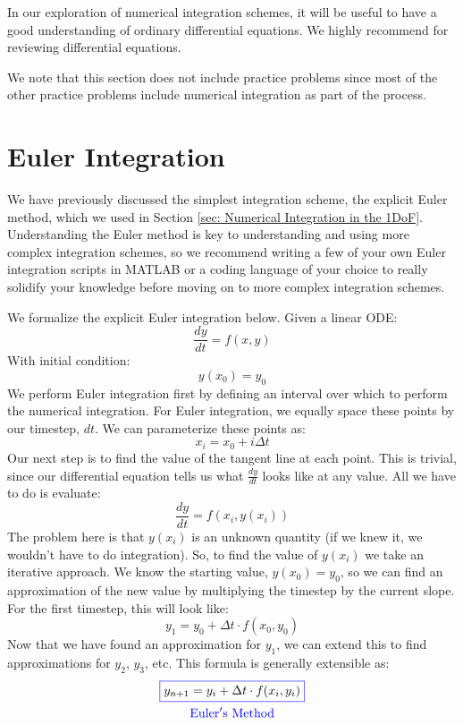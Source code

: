 \documentclass[12pt]{report}
\begin{document}
In our exploration of numerical integration schemes, it will be useful to have a good understanding of ordinary differential equations. We highly recommend \cite{dawkins_differential_2023} for reviewing differential equations.

We note that this section does not include practice problems since most of the other practice problems include numerical integration as part of the process.

\section{Euler Integration}\label{sec:euler integration}
We have previously discussed the simplest integration scheme, the explicit Euler method, which we used in Section \ref{sec: Numerical Integration in the 1DoF}. Understanding the Euler method is key to understanding and using more complex integration schemes, so we recommend writing a few of your own Euler integration scripts in MATLAB or a coding language of your choice to really solidify your knowledge before moving on to more complex integration schemes. 

We formalize the explicit Euler integration below. Given a linear ODE:
$$\frac{dy}{dt}=f\left(x,y\right)$$
With initial condition:
$$y(x_0)=y_0$$
We perform Euler integration first by defining an interval over which to perform the numerical integration. For Euler integration, we equally space these points by our timestep, $dt$. We can parameterize these points as:
$$x_i=x_0+i\Delta t$$
Our next step is to find the value of the tangent line at each point. This is trivial, since our differential equation tells us what $\frac{dy}{dt}$ looks like at any value. All we have to do is evaluate:
$$\frac{dy}{dt}=f\left(x_i,y(x_i)\right)$$
The problem here is that $y(x_i)$ is an unknown quantity (if we knew it, we wouldn’t have to do integration). So, to find the value of $y(x_i)$ we take an iterative approach. We know the starting value, $y(x_0)=y_0$, so we can find an approximation of the new value by multiplying the timestep by the current slope. For the first timestep, this will look like:
$$y_1=y_0+\Delta t\cdot f(x_0,y_0)$$
Now that we have found an approximation for $y_1$, we can extend this to find approximations for $y_2$, $y_3$, etc. This formula is generally extensible as:
\begin{gather}
    \color{blue}\boxed{\color{black}y_{n+1}=y_i+\Delta t \cdot f(x_i,y_i)}\\
    \color{blue}\mathrm{Euler's \ Method}
\end{gather}
\end{document}
